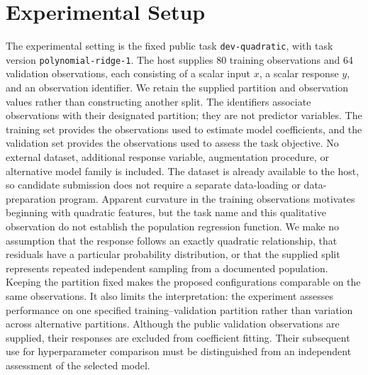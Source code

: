 \documentclass[11pt]{article}
\begin{document}
\section{Experimental Setup}
The experimental setting is the fixed public task \texttt{dev-quadratic}, with task version \texttt{polynomial-ridge-1}. The host supplies 80 training observations and 64 validation observations, each consisting of a scalar input \(x\), a scalar response \(y\), and an observation identifier. We retain the supplied partition and observation values rather than constructing another split. The identifiers associate observations with their designated partition; they are not predictor variables. The training set provides the observations used to estimate model coefficients, and the validation set provides the observations used to assess the task objective. No external dataset, additional response variable, augmentation procedure, or alternative model family is included. The dataset is already available to the host, so candidate submission does not require a separate data-loading or data-preparation program. Apparent curvature in the training observations motivates beginning with quadratic features, but the task name and this qualitative observation do not establish the population regression function. We make no assumption that the response follows an exactly quadratic relationship, that residuals have a particular probability distribution, or that the supplied split represents repeated independent sampling from a documented population. Keeping the partition fixed makes the proposed configurations comparable on the same observations. It also limits the interpretation: the experiment assesses performance on one specified training--validation partition rather than variation across alternative partitions. Although the public validation observations are supplied, their responses are excluded from coefficient fitting. Their subsequent use for hyperparameter comparison must be distinguished from an independent assessment of the selected model.
\end{document}
